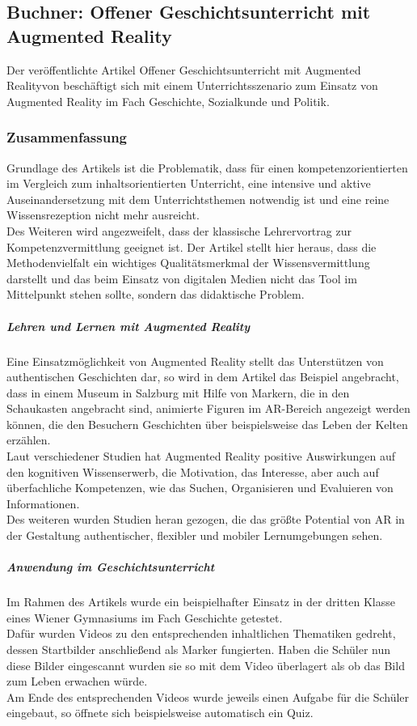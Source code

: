 \subsection{Buchner: Offener Geschichtsunterricht mit Augmented Reality}
Der \citeyear{buchner:ar-geschichtsunterricht} veröffentlichte Artikel \glqq Offener Geschichtsunterricht mit Augmented Reality\grqq von \citeauthor{buchner:ar-geschichtsunterricht} beschäftigt sich mit einem Unterrichtsszenario zum Einsatz von Augmented Reality im Fach Geschichte, Sozialkunde und Politik. 


\subsubsection{Zusammenfassung}
Grundlage des Artikels ist die Problematik, dass für einen kompetenzorientierten im Vergleich zum inhaltsorientierten Unterricht, eine intensive und aktive Auseinandersetzung mit dem Unterrichtsthemen notwendig ist und eine reine Wissensrezeption nicht mehr ausreicht.\\ 
Des Weiteren wird angezweifelt, dass der klassische Lehrervortrag zur Kompetenzvermittlung geeignet ist. Der Artikel stellt hier heraus, dass die Methodenvielfalt ein wichtiges Qualitätsmerkmal der Wissensvermittlung darstellt und das beim Einsatz von digitalen Medien nicht das Tool im Mittelpunkt stehen sollte, sondern das didaktische Problem.

\subparagraph{Lehren und Lernen mit Augmented Reality}
Eine Einsatzmöglichkeit von Augmented Reality stellt das Unterstützen von authentischen Geschichten dar, so wird in dem Artikel das Beispiel angebracht, dass in einem Museum in Salzburg mit Hilfe von Markern, die in den Schaukasten angebracht sind, animierte Figuren im AR-Bereich angezeigt werden können, die den Besuchern Geschichten über beispielsweise das Leben der Kelten erzählen. \\
Laut verschiedener Studien hat Augmented Reality positive Auswirkungen auf den kognitiven Wissenserwerb, die Motivation, das Interesse, aber auch auf überfachliche Kompetenzen, wie das Suchen, Organisieren und Evaluieren von Informationen. \\
Des weiteren wurden Studien heran gezogen, die das größte Potential von AR in der Gestaltung authentischer, flexibler und mobiler Lernumgebungen sehen. \citep[Kapitel 3]{buchner:ar-geschichtsunterricht}

\subparagraph{Anwendung im Geschichtsunterricht}
Im Rahmen des Artikels wurde ein beispielhafter Einsatz in der dritten Klasse eines Wiener Gymnasiums im Fach Geschichte getestet.\\
Dafür wurden Videos zu den entsprechenden inhaltlichen Thematiken gedreht, dessen Startbilder anschließend als Marker fungierten. Haben die Schüler nun diese Bilder eingescannt wurden sie so mit dem Video überlagert als ob das Bild zum Leben erwachen würde. \\
Am Ende des entsprechenden Videos wurde jeweils einen Aufgabe für die Schüler eingebaut, so öffnete sich beispielsweise automatisch ein Quiz. \citep[Kapitel 4]{buchner:ar-geschichtsunterricht}

